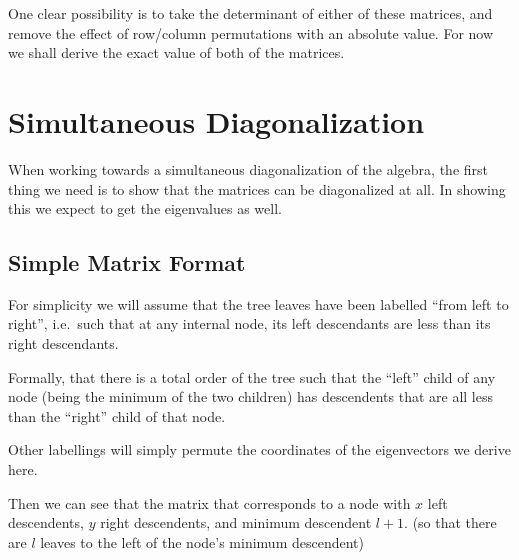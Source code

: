 \documentclass{report}
\begin{document}
One clear possibility is to take the determinant of either of these matrices,
and remove the effect of row/column permutations with an absolute value.
For now we shall derive the exact value of both of the matrices.


\section{Simultaneous Diagonalization}

%
%
%
%

When working towards a simultaneous diagonalization of the algebra, the first
thing we need is to show that the matrices can be diagonalized at all.
In showing this we expect to get the eigenvalues as well.


\subsection{Simple Matrix Format}

For simplicity we will assume that the tree leaves have been labelled ``from
left to right'', i.e.\ such that at any internal node, its left descendants are
less than its right descendants.

Formally, that there is a total order of the tree such that the ``left'' child
of any node (being the minimum of the two children) has descendents that are
all less than the ``right'' child of that node.

Other labellings will simply permute the coordinates of the eigenvectors we
derive here.

Then we can see that the matrix that corresponds to a node with $x$ left
descendents, $y$ right descendents, and minimum descendent $l+1$. (so that
there are $l$ leaves to the left of the node's minimum descendent)
\end{document}
